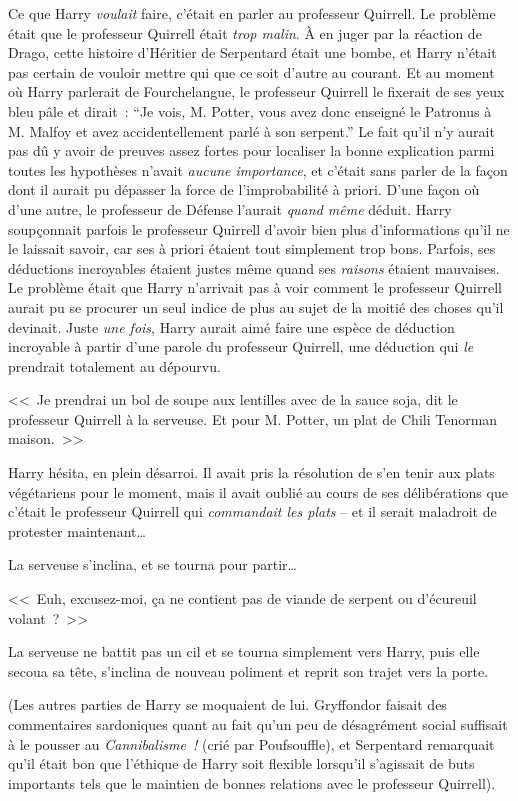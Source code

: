 Ce que Harry \emph{voulait} faire, c'était en parler au professeur Quirrell. Le problème était que le professeur Quirrell était \emph{trop malin}. À en juger par la réaction de Drago, cette histoire d'Héritier de Serpentard était une bombe, et Harry n'était pas certain de vouloir mettre qui que ce soit d'autre au courant. Et au moment où Harry parlerait de Fourchelangue, le professeur Quirrell le fixerait de ses yeux bleu pâle et dirait~: “Je vois, M. Potter, vous avez donc enseigné le Patronus à M. Malfoy et avez accidentellement parlé à son serpent.”
Le fait qu'il n'y aurait pas dû y avoir de preuves assez fortes pour localiser la bonne explication parmi toutes les hypothèses n'avait \emph{aucune importance}, et c'était sans parler de la façon dont il aurait pu dépasser la force de l'improbabilité à priori. D'une façon où d'une autre, le professeur de Défense l'aurait \emph{quand même} déduit. Harry soupçonnait parfois le professeur Quirrell d'avoir bien plus d'informations qu'il ne le laissait savoir, car ses à priori étaient tout simplement trop bons. Parfois, ses déductions incroyables étaient justes même quand ses \emph{raisons} étaient mauvaises. Le problème était que Harry n'arrivait pas à voir comment le professeur Quirrell aurait pu se procurer un seul indice de plus au sujet de la moitié des choses qu'il devinait. Juste \emph{une fois}, Harry aurait aimé faire une espèce de déduction incroyable à partir d'une parole du professeur Quirrell, une déduction qui \emph{le} prendrait totalement au dépourvu.

\later

<<~Je prendrai un bol de soupe aux lentilles avec de la sauce soja, dit le professeur Quirrell à la serveuse. Et pour M. Potter, un plat de Chili Tenorman maison.~>>

Harry hésita, en plein désarroi. Il avait pris la résolution de s'en tenir aux plats végétariens pour le moment, mais il avait oublié au cours de ses délibérations que c'était le professeur Quirrell qui \emph{commandait les plats} -- et il serait maladroit de protester maintenant…

La serveuse s'inclina, et se tourna pour partir…

<<~Euh, excusez-moi, ça ne contient pas de viande de serpent ou d'écureuil volant~?~>>

La serveuse ne battit pas un cil et se tourna simplement vers Harry, puis elle secoua sa tête, s'inclina de nouveau poliment et reprit son trajet vers la porte.

(Les autres parties de Harry se moquaient de lui. Gryffondor faisait des commentaires sardoniques quant au fait qu'un peu de désagrément social suffisait à le pousser au \emph{Cannibalisme~!} (crié par Poufsouffle), et Serpentard remarquait qu'il était bon que l'éthique de Harry soit flexible lorsqu'il s'agissait de buts importants tels que le maintien de bonnes relations avec le professeur Quirrell).

